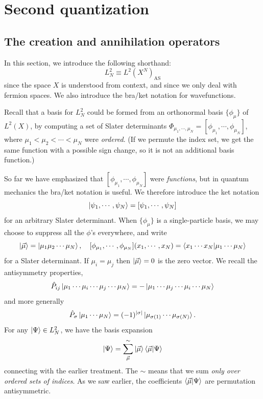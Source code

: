 \documentclass{report}
\theoremstyle{plain}
\theoremstyle{definition}
\begin{document}
\section{Second quantization}

\subsection{The creation and annihilation operators}

In this section, we introduce the following shorthand:
\begin{equation}
  L^2_N \equiv L^2(X^N)_\text{AS}
\end{equation}
since the space $X$ is understood from context, and since we only deal
with fermion spaces. We also introduce the bra/ket notation for
wavefunctions. 

Recall that a basis for $L^2_N$ could be formed from an orthonormal
basis $\{\phi_\mu\}$ of $L^2(X)$, by computing a set of Slater
determinants $\Phi_{\mu_1,\cdots,\mu_N} = [\phi_{\mu_1},\cdots,\phi_{\mu_N}]$, where
$\mu_1<\mu_2<\cdots<\mu_N$ were \emph{ordered}. (If we permute the
index set, we get the same function with a possible sign change, so it
is not an additional basis function.) 

So far we have emphasized that $[\phi_{\mu_1},\cdots,\phi_{\mu_N}]$
were \emph{functions}, but in quantum mechanics the bra/ket notation
is useful. We therefore introduce the ket notation
\begin{equation}
  \ket{\psi_1,\cdots,\psi_N} = [\psi_1,\cdots,\psi_N]
\end{equation}
for an arbitrary Slater determinant. When $\{\phi_\mu\}$ is a
single-particle basis, we may choose to suppress all the $\phi$'s
everywhere, and write
\begin{equation}
  \ket{\vec{\mu}} = \ket{\mu_1\mu_2\cdots\mu_N}, \quad
  [\phi_{\mu_1},\cdots,\phi_{\mu_N}](x_1,\cdots,x_N) = \braket{x_1\cdots x_N|\mu_1\cdots\mu_N}
\end{equation}
for a Slater determinant. If
$\mu_i=\mu_j$ then $\ket{\vec{\mu}} = 0$ is the zero vector. We recall
the antisymmetry properties,
\begin{equation}
  \hat{P}_{ij}\ket{\mu_1\cdots\mu_i\cdots\mu_j\cdots\mu_N} =
  -\ket{\mu_1\cdots\mu_j\cdots\mu_i\cdots\mu_N} 
\end{equation}
and more generally
\begin{equation}
  \hat{P}_\sigma \ket{\mu_1\cdots\mu_N} = (-1)^{|\sigma|} \ket{\mu_{\sigma(1)}\cdots\mu_{\sigma(N)}}.
\end{equation}
For any $\ket{\Psi}\in L^2_N$, we have the basis expansion
\begin{equation}
  \ket{\Psi} = \sum_{\vec{\mu}}^\sim \ket{\vec{\mu}}\braket{\vec{\mu}|\Psi}
\end{equation}
connecting with the earlier treatment. The $\sim$ means that we sum
\emph{only over ordered sets of indices}. As we saw earlier, the
coefficients $\braket{\vec{\mu}|\Psi}$ are permutation antisymmetric.
\end{document}
